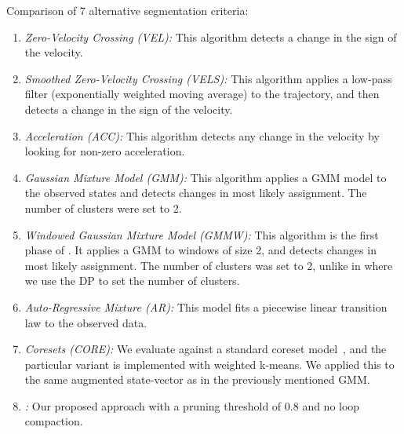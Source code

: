 Comparison of 7 alternative segmentation criteria:
\begin{enumerate}
    \item \emph{Zero-Velocity Crossing (VEL): } This algorithm detects a change in the sign of the velocity. 
    \item \emph{Smoothed Zero-Velocity Crossing (VELS): } This algorithm applies a low-pass filter (exponentially weighted moving average) to the trajectory, and then detects a change in the sign of the velocity.
    \item \emph{Acceleration (ACC): } This algorithm detects any change in the velocity by looking for non-zero acceleration.
    \item \emph{Gaussian Mixture Model (GMM): } This algorithm applies a GMM model to the observed states and detects changes in most likely assignment. The number of clusters were set to 2.
    \item \emph{Windowed Gaussian Mixture Model (GMMW): } This algorithm is the first phase of \tsc. It applies a GMM to windows of size 2, and detects changes in most likely assignment. The number of clusters was set to 2, unlike in \tsc where we use the DP to set the number of clusters.
    \item \emph{Auto-Regressive Mixture (AR): } This model fits a piecewise linear transition law to the observed data.
    \item  \emph{Coresets (CORE): } We evaluate against a standard coreset model~\cite{sung2012trajectory, volkov2015coresets}, and the particular variant is implemented with weighted k-means. We applied this to the same augmented state-vector as in the previously mentioned GMM.
    \item \emph{\tsc: } Our proposed approach with a pruning threshold of $0.8$ and no loop compaction.
\end{enumerate}

